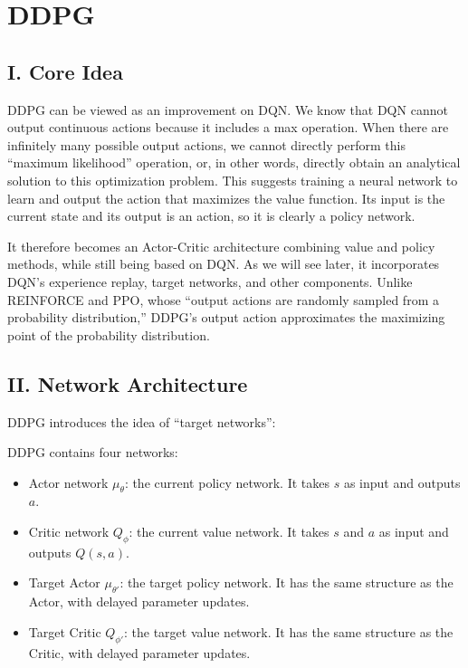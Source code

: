 \setcounter{section}{4}

\hypertarget{ddpg}{%
\section{DDPG}\label{ddpg}}

\hypertarget{i.-core-idea-3}{%
\subsection{I. Core Idea}\label{i.-core-idea-3}}

DDPG can be viewed as an improvement on DQN. We know that DQN cannot output continuous actions because it includes a max operation. When there are infinitely many possible output actions, we cannot directly perform this ``maximum likelihood'' operation, or, in other words, directly obtain an analytical solution to this optimization problem. This suggests training a neural network to learn and output the action that maximizes the value function. Its input is the current state and its output is an action, so it is clearly a policy network.

It therefore becomes an Actor-Critic architecture combining value and policy methods, while still being based on DQN. As we will see later, it incorporates DQN's experience replay, target networks, and other components. Unlike REINFORCE and PPO, whose ``output actions are randomly sampled from a probability distribution,'' DDPG's output action approximates the maximizing point of the probability distribution.

\hypertarget{ii.-network-architecture}{%
\subsection{II. Network Architecture}\label{ii.-network-architecture}}

DDPG introduces the idea of ``target networks'':

DDPG contains four networks:

\begin{itemize}
\tightlist
\item
  Actor network \(\mu_\theta\): the current policy network. It takes \(s\) as input and outputs \(a\).
\item
  Critic network \(Q_\phi\): the current value network. It takes \(s\) and \(a\) as input and outputs \(Q(s,a)\).
\item
  Target Actor \(\mu_{\theta'}\): the target policy network. It has the same structure as the Actor, with delayed parameter updates.
\item
  Target Critic \(Q_{\phi'}\): the target value network. It has the same structure as the Critic, with delayed parameter updates.
\end{itemize}

